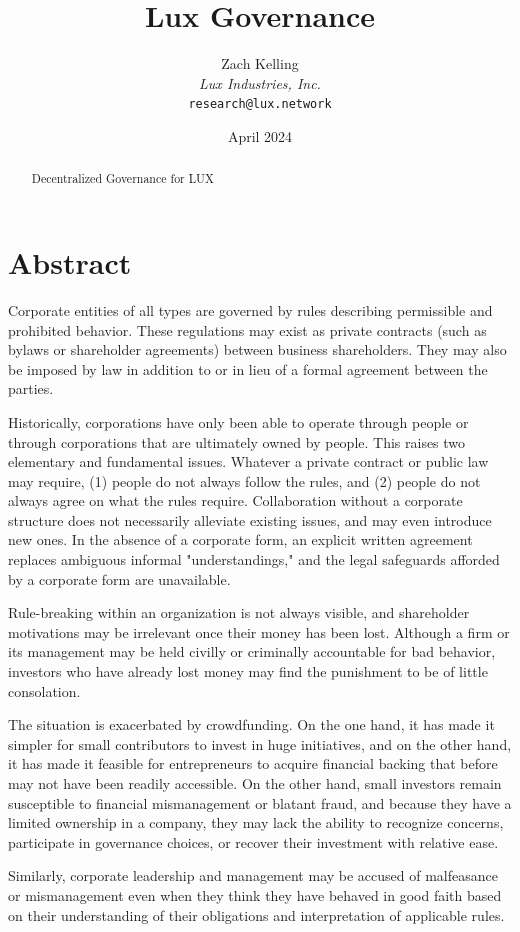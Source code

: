 \documentclass[11pt]{article}
\title{Lux Governance}
\author{Zach Kelling\\\textit{Lux Industries, Inc.}\\\texttt{research@lux.network}}
\date{April 2024}
\begin{document}
\luxcoverpage

\begin{abstract}
Decentralized Governance for LUX
\end{abstract}

\tableofcontents
\newpage


\section{Abstract}

Corporate entities of all types are governed by rules describing permissible and prohibited behavior. These regulations may exist as private contracts (such as bylaws or shareholder agreements) between business shareholders. They may also be imposed by law in addition to or in lieu of a formal agreement between the parties.


Historically, corporations have only been able to operate through people or through corporations that are ultimately owned by people. This raises two elementary and fundamental issues. Whatever a private contract or public law may require, (1) people do not always follow the rules, and (2) people do not always agree on what the rules require. Collaboration without a corporate structure does not necessarily alleviate existing issues, and may even introduce new ones. In the absence of a corporate form, an explicit written agreement replaces ambiguous informal "understandings," and the legal safeguards afforded by a corporate form are unavailable.


Rule-breaking within an organization is not always visible, and shareholder motivations may be irrelevant once their money has been lost. Although a firm or its management may be held civilly or criminally accountable for bad behavior, investors who have already lost money may find the punishment to be of little consolation.


The situation is exacerbated by crowdfunding. On the one hand, it has made it simpler for small contributors to invest in huge initiatives, and on the other hand, it has made it feasible for entrepreneurs to acquire financial backing that before may not have been readily accessible. On the other hand, small investors remain susceptible to financial mismanagement or blatant fraud, and because they have a limited ownership in a company, they may lack the ability to recognize concerns, participate in governance choices, or recover their investment with relative ease.


Similarly, corporate leadership and management may be accused of malfeasance or mismanagement even when they think they have behaved in good faith based on their understanding of their obligations and interpretation of applicable rules.
\end{document}
